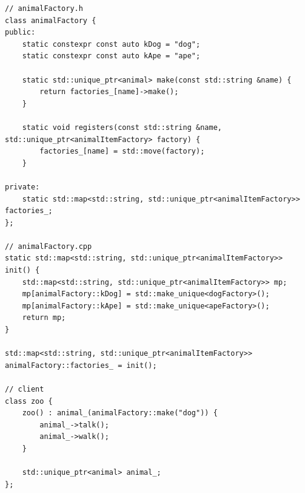 \documentclass[11pt]{article}
\begin{document}
\begin{itemize}
\begin{multicols}{2}
\begin{lstlisting}
// animalFactory.h
class animalFactory {
public:
    static constexpr const auto kDog = "dog";
    static constexpr const auto kApe = "ape";

    static std::unique_ptr<animal> make(const std::string &name) {
        return factories_[name]->make();
    }

    static void registers(const std::string &name, std::unique_ptr<animalItemFactory> factory) {
        factories_[name] = std::move(factory);
    }

private:
    static std::map<std::string, std::unique_ptr<animalItemFactory>> factories_;
};

// animalFactory.cpp
static std::map<std::string, std::unique_ptr<animalItemFactory>> init() {
    std::map<std::string, std::unique_ptr<animalItemFactory>> mp;
    mp[animalFactory::kDog] = std::make_unique<dogFactory>();
    mp[animalFactory::kApe] = std::make_unique<apeFactory>();
    return mp;
}

std::map<std::string, std::unique_ptr<animalItemFactory>> animalFactory::factories_ = init();

// client
class zoo {
    zoo() : animal_(animalFactory::make("dog")) {
        animal_->talk();
        animal_->walk();
    }

    std::unique_ptr<animal> animal_;
};
            \end{lstlisting}
        \end{multicols}
    \end{itemize}
\end{document}

